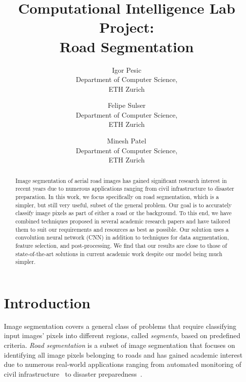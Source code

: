 \documentclass[10pt,conference,compsocconf]{IEEEtran}
\begin{document}
\title{Computational Intelligence Lab Project:\\ Road Segmentation}

\author{
  Igor Pesic\\
  Department of Computer Science,\\ ETH Zurich
  \and
  Felipe Sulser\\
  Department of Computer Science,\\ ETH Zurich
  \and
  Minesh Patel\\
  Department of Computer Science,\\ ETH Zurich
}

\maketitle

\begin{abstract}
  Image segmentation of aerial road images has gained significant research
  interest in recent years due to numerous applications ranging from civil
  infrastructure to disaster preparation. In this work, we focus specifically
  on road segmentation, which is a simpler, but still very useful, subset of
  the general problem. Our goal is to accurately classify image pixels as part
  of either a road or the background. To this end, we have combined techniques
  proposed in several academic research papers and have tailored them to suit
  our requirements and resources as best as possible. Our solution uses a
  convolution neural network (CNN) in addition to techniques for data
  augmentation, feature selection, and post-processing. We find that our
  results are close to those of state-of-the-art solutions in current academic
  work despite our model being much simpler.
\end{abstract}

\section{Introduction}

Image segmentation covers a general class of problems that require classifying
input images' pixels into different regions, called \emph{segments}, based on
predefined criteria.  \emph{Road segmentation} is a subset of image
segmentation that focuses on identifying all image pixels belonging to roads
and has gained academic interest due to numerous real-world applications
ranging from automated monitoring of civil
infrastructure~\cite{radopoulou2016improving} to disaster
preparedness~\cite{li2007fuzzy}. 
\end{document}
